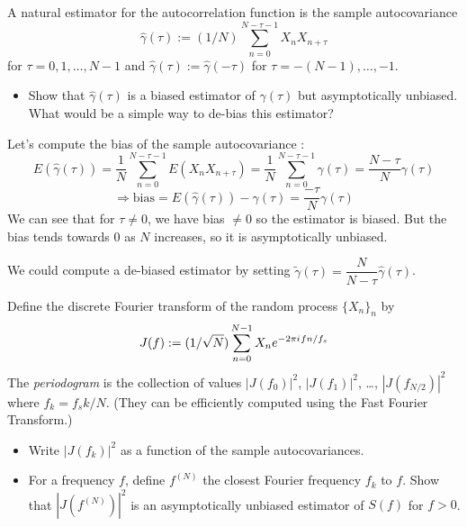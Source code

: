 \documentclass[11pt]{article}
\begin{document}
\begin{exercise}

    A natural estimator for the autocorrelation function is the sample autocovariance
    \begin{equation}
        \hat{\gamma}(\tau) := (1/N) \sum_{n=0}^{N-\tau-1} X_n X_{n+\tau}
    \end{equation}
    for $\tau=0,1,\dots,N-1$ and $\hat{\gamma}(\tau):=\hat{\gamma}(-\tau)$ for $\tau=-(N-1),\dots,-1$.
    \begin{itemize}
        \item Show that $\hat{\gamma}(\tau)$ is a biased estimator of $\gamma(\tau)$ but asymptotically unbiased.
        What would be a simple way to de-bias this estimator?
    \end{itemize}

\end{exercise}

\begin{solution}

    Let's compute the bias of the sample autocovariance :
    $$E(\hat{\gamma}(\tau))=\frac{1}{N}\sum_{n=0}^{N-\tau-1}E(X_nX_{n+\tau})=\frac{1}{N}\sum_{n=0}^{N-\tau-1}\gamma(\tau)=\frac{N-\tau}{N}\gamma(\tau)$$
    $$\Rightarrow \textrm{bias} = E(\hat{\gamma}(\tau))-\gamma(\tau) = \frac{-\tau}{N} \gamma(\tau)$$
    We can see that for $\tau\neq 0$, we have bias $\neq 0$ so the estimator is biased. But the bias tends towards 0 as $N$ increases, so it is asymptotically unbiased.

    We could compute a de-biased estimator by setting $\tilde{\gamma}(\tau) = \dfrac{N}{N - \tau} \hat{\gamma}(\tau)$.

\end{solution}

\begin{exercise}
    Define the discrete Fourier transform of the random process $\{X_n\}_n$ by
    \begin{equation}
        J(f) := (1/\sqrt{N})\sum_{n=0}^{N-1} X_n e^{-2\pi{i\mkern1mu} f n/f_s}
    \end{equation}
    The \textit{periodogram} is the collection of values $|J(f_0)|^2$, $|J(f_1)|^2$, \dots, $|J(f_{N/2})|^2$ where $f_k = f_s k/N$.
    (They can be efficiently computed using the Fast Fourier Transform.)
    \begin{itemize}
        \item Write $|J(f_k)|^2$ as a function of the sample autocovariances.
        \item For a frequency $f$, define $f^{(N)}$ the closest Fourier frequency $f_k$ to $f$.
        Show that $|J(f^{(N)})|^2$ is an asymptotically unbiased estimator of $S(f)$ for $f>0$.
    \end{itemize}
\end{exercise}
\end{document}

